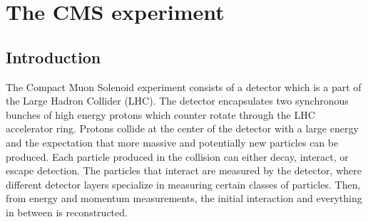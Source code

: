 \setcounter{secnumdepth}{3}
\setcounter{tocdepth}{3}
\setlength{\parskip}{\smallskipamount}
\setlength{\parindent}{0pt}


\makeatletter


\providecommand{\tabularnewline}{\\}


\makeatother


\chapter{The CMS experiment}

\section{Introduction} The Compact Muon Solenoid experiment consists of a detector which is a part of the Large Hadron Collider (LHC). The detector encapsulates two synchronous bunches of high energy protons  which counter rotate through the LHC accelerator ring.  Protons collide at the center of the detector with a large energy and the expectation that more massive and potentially new particles can be produced. Each particle produced in the collision can either decay, interact, or escape detection. The particles that interact are measured by the detector, where different detector layers specialize in measuring certain classes of particles. Then, from energy and momentum measurements, the initial interaction and everything in between is reconstructed.   



